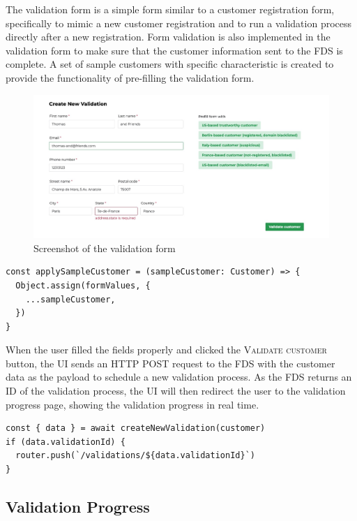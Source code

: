     The validation form is a simple form similar to a customer registration form, specifically to mimic a new customer registration and to run a validation process directly after a new registration. Form validation is also implemented in the validation form to make sure that the customer information sent to the FDS is complete. A set of sample customers with specific characteristic is created to provide the functionality of pre-filling the validation form. 

    \begin{figure}[!ht]
      \includegraphics[width=\textwidth]{images/ss_customer_form.jpeg}
      \caption{Screenshot of the validation form}
    \end{figure}

    \begin{lstlisting}[style=es6, caption={Prefilling form values with a sample customer data (TypeScript)}]
const applySampleCustomer = (sampleCustomer: Customer) => {
  Object.assign(formValues, {
    ...sampleCustomer,
  })
}
    \end{lstlisting}

    When the user filled the fields properly and clicked the \textsc{Validate customer} button, the UI sends an HTTP POST request to the FDS with the customer data as the payload to schedule a new validation process. As the FDS returns an ID of the validation process, the UI will then redirect the user to the validation progress page, showing the validation progress in real time. 

    \begin{lstlisting}[style=es6, caption={ (TypeScript)}]
const { data } = await createNewValidation(customer)
if (data.validationId) {
  router.push(`/validations/${data.validationId}`)
}
    \end{lstlisting}

  \subsection{Validation Progress}
  
